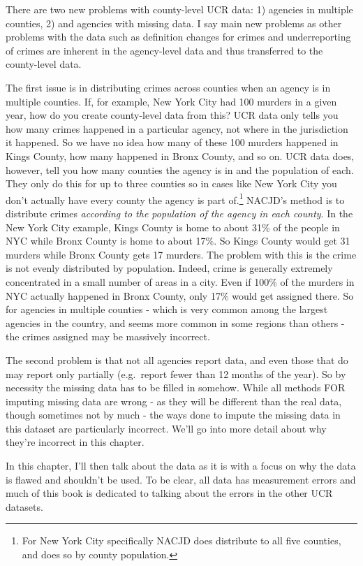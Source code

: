 \documentclass[
  12pt,
  openany]{book}
\begin{document}
There are two new problems with county-level UCR data: 1) agencies in multiple counties, 2) and agencies with missing data. I say main new problems as other problems with the data such as definition changes for crimes and underreporting of crimes are inherent in the agency-level data and thus transferred to the county-level data.

The first issue is in distributing crimes across counties when an agency is in multiple counties. If, for example, New York City had 100 murders in a given year, how do you create county-level data from this? UCR data only tells you how many crimes happened in a particular agency, not where in the jurisdiction it happened. So we have no idea how many of these 100 murders happened in Kings County, how many happened in Bronx County, and so on. UCR data does, however, tell you how many counties the agency is in and the population of each. They only do this for up to three counties so in cases like New York City you don't actually have every county the agency is part of.\footnote{For New York City specifically NACJD does distribute to all five counties, and does so by county population.} NACJD's method is to distribute crimes \emph{according to the population of the agency in each county}. In the New York City example, Kings County is home to about 31\% of the people in NYC while Bronx County is home to about 17\%. So Kings County would get 31 murders while Bronx County gets 17 murders. The problem with this is the crime is not evenly distributed by population. Indeed, crime is generally extremely concentrated in a small number of areas in a city. Even if 100\% of the murders in NYC actually happened in Bronx County, only 17\% would get assigned there. So for agencies in multiple counties - which is very common among the largest agencies in the country, and seems more common in some regions than others - the crimes assigned may be massively incorrect.

The second problem is that not all agencies report data, and even those that do may report only partially (e.g.~report fewer than 12 months of the year). So by necessity the missing data has to be filled in somehow. While all methods FOR imputing missing data are wrong - as they will be different than the real data, though sometimes not by much - the ways done to impute the missing data in this dataset are particularly incorrect. We'll go into more detail about why they're incorrect in this chapter.

In this chapter, I'll then talk about the data as it is with a focus on why the data is flawed and shouldn't be used. To be clear, all data has measurement errors and much of this book is dedicated to talking about the errors in the other UCR datasets.
\end{document}
